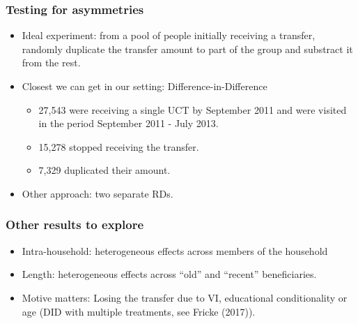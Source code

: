 \documentclass{beamer}
\begin{document}
\begin{frame}
		\frametitle{Testing for asymmetries}
		\begin{itemize}
			\item Ideal experiment: from a pool of people initially receiving a transfer, randomly duplicate the transfer amount to part of the group and substract it from the rest.
			\item Closest we can get in our setting: Difference-in-Difference
			\begin{itemize}
				\item 27,543 were receiving a single UCT by September 2011 and were visited in the period September 2011 - July 2013.
				\item 15,278 stopped receiving the transfer.
				\item 7,329 duplicated their amount.
			\end{itemize}
			\item Other approach: two separate RDs.
		\end{itemize}
\end{frame}

\begin{frame}
\frametitle{Other results to explore}
\begin{itemize}
	\item Intra-household: heterogeneous effects across members of the household 
	\item Length: heterogeneous effects across ``old'' and ``recent'' beneficiaries.
	\item Motive matters: Losing the transfer due to VI, educational conditionality or age (DID with multiple treatments, see Fricke (2017)).
\end{itemize}
\end{frame}
	
\end{document}
